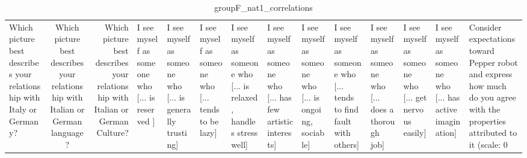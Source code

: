 \begin{table}
\caption{groupF_nat1_correlations}
\label{tab:groupF_nat1_correlations}
\begin{tabular}{lcr}
\toprule
Which picture best describes your relationship with Italy or Germany? & Which picture best describes your relationship with Italian or German language? & Which picture best describes your relationship with Italian or German Culture? & I see myself as someone who  [... is reserved ] & I see myself as someone who  [... is generally trusting] & I see myself as someone who  [... tends to be lazy] & I see myself as someone who  [... is relaxed, handles stress well] & I see myself as someone who  [... has few artistic interests] & I see myself as someone who  [... is ongoing, sociable] & I see myself as someone who  [... tends to find fault with others] & I see myself as someone who  [... does a thorough job] & I see myself as someone who  [... get nervous easily] & I see myself as someone who  [... has active imagination] & Consider expectations toward Pepper robot and express how much do you agree with the properties attributed to it (scale: 0%
\end{tabular}
\end{table}
